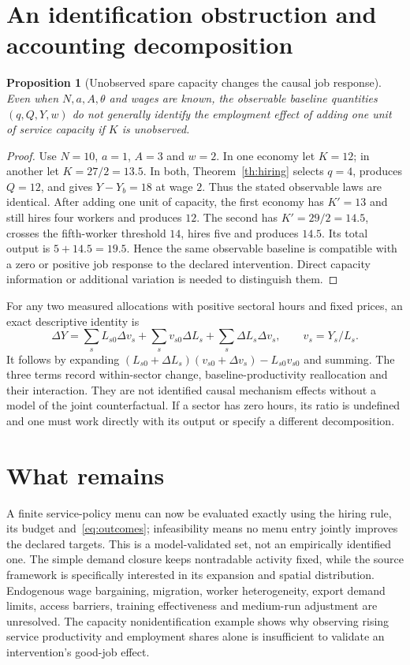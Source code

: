 \documentclass[11pt,a4paper]{article}
\newtheorem{proposition}[theorem]{Proposition}
\theoremstyle{definition}
\theoremstyle{remark}
\begin{document}
\section{An identification obstruction and accounting decomposition}
\begin{proposition}[Unobserved spare capacity changes the causal job response]\label{pr:identification}
Even when $N,a,A,\theta$ and wages are known, the observable baseline quantities $(q,Q,Y,w)$ do not generally identify the employment effect of adding one unit of service capacity if $K$ is unobserved.
\end{proposition}
\begin{proof}
Use $N=10$, $a=1$, $A=3$ and $w=2$. In one economy let $K=12$; in another let $K=27/2=13.5$. In both, Theorem~\ref{th:hiring} selects $q=4$, produces $Q=12$, and gives $Y-Y_b=18$ at wage $2$. Thus the stated observable laws are identical. After adding one unit of capacity, the first economy has $K'=13$ and still hires four workers and produces $12$. The second has $K'=29/2=14.5$, crosses the fifth-worker threshold $14$, hires five and produces $14.5$. Its total output is $5+14.5=19.5$. Hence the same observable baseline is compatible with a zero or positive job response to the declared intervention. Direct capacity information or additional variation is needed to distinguish them.
\end{proof}

For any two measured allocations with positive sectoral hours and fixed prices, an exact descriptive identity is
\[
 \Delta Y=\sum_sL_{s0}\Delta v_s
          +\sum_sv_{s0}\Delta L_s
          +\sum_s\Delta L_s\Delta v_s,
 \qquad v_s=Y_s/L_s.
\]
It follows by expanding $(L_{s0}+\Delta L_s)(v_{s0}+\Delta v_s)-L_{s0}v_{s0}$ and summing. The three terms record within-sector change, baseline-productivity reallocation and their interaction. They are not identified causal mechanism effects without a model of the joint counterfactual. If a sector has zero hours, its ratio is undefined and one must work directly with its output or specify a different decomposition.

\section{What remains}
A finite service-policy menu can now be evaluated exactly using the hiring rule, its budget and~\eqref{eq:outcomes}; infeasibility means no menu entry jointly improves the declared targets. This is a model-validated set, not an empirically identified one. The simple demand closure keeps nontradable activity fixed, while the source framework is specifically interested in its expansion and spatial distribution. Endogenous wage bargaining, migration, worker heterogeneity, export demand limits, access barriers, training effectiveness and medium-run adjustment are unresolved. The capacity nonidentification example shows why observing rising service productivity and employment shares alone is insufficient to validate an intervention's good-job effect.
\end{document}
